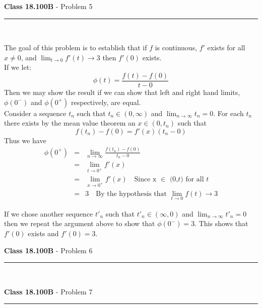 \documentclass[11pt,reqno]{article}
\begin{document}
\newpage

\vspace{15pt}
\begin{flushleft} 
\textbf{Class 18.100B} - Problem 5\\
\rule{500pt}{1pt}\\
\end{flushleft} 

The goal of this problem is to establish that if $f$ is continuous, $f'$ exists for all $x \neq 0$, and $\lim_{t \to 0}f'(t) \to 3$ then $f'(0)$ exists.\\
\indent If we let:
\[\phi(t) = \frac{f(t) - f(0)}{t - 0}\]
Then we may show the result if we can show that left and right hand limits, $\phi(0^-)$ and $\phi(0^+)$ respectively, are equal.\\
\indent Consider a sequence $t_n$ such that $t_n \in (0,\infty)$ and $\lim_{n \to \infty}t_n = 0$. For each $t_n$ there exists by the mean value theorem an $x \in (0,t_n)$ such that
\[ f(t_n) - f(0) = f'(x)(t_n - 0)\]
Thus we have
\begin{eqnarray*}
\phi(0^+) &=& \lim_{n \to \infty} \frac{f(t_n) - f(0)}{t_n - 0} \\
	       &=& \lim_{t \to 0^+} f'(x) \\
      	       &=& \lim_{x \to 0^+} f'(x) \quad \text{Since x $\in$ (0,$t$) for all $t$}\\
	       &=& 3 \quad \text{By the hypothesis that $\lim_{t \to 0}f(t) \to 3$}
\end{eqnarray*}

If we chose another sequence $t'_n$ such that $t'_n \in (\infty,0)$ and $\lim_{n \to \infty}t'_n = 0$
then we repeat the argument above to show that $\phi(0^-) = 3$. This shows that $f'(0)$ exists and $f'(0) = 3$.

\vspace{15pt}
\begin{flushleft} 
\textbf{Class 18.100B} - Problem 6\\
\rule{500pt}{1pt}\\
\end{flushleft} 


\vspace{15pt}
\begin{flushleft} 
\textbf{Class 18.100B} - Problem 7\\
\rule{500pt}{1pt}\\
\end{flushleft} 


\end{document}
